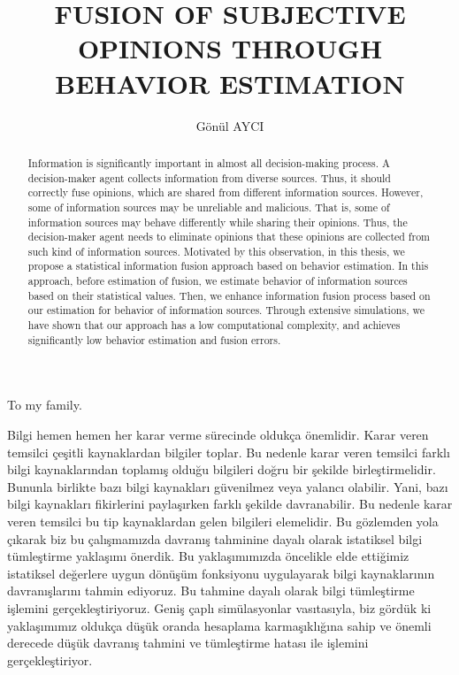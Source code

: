 \documentclass[a4,12pt]{ozu-thesis}
\title{ FUSION OF SUBJECTIVE OPINIONS THROUGH BEHAVIOR ESTIMATION}
\author{G\"{o}n\"{u}l AYCI}
\begin{document}


\begin{preliminary}

\begin{dedication}
\null\vfil
{\large
\begin{center}
To my family.
\end{center}}
\vfil\null
\end{dedication}

\begin{abstract}
Information is significantly important in almost all decision-making process. A decision-maker agent collects information from diverse sources. Thus, it should correctly fuse opinions, which are shared from different information sources. However, some of information sources may be unreliable and malicious. That is, some of information sources may behave differently while sharing their opinions. Thus, the decision-maker agent needs to eliminate opinions that these opinions are collected from such kind of information sources. Motivated by this observation, in this thesis, we propose a statistical information fusion approach based on behavior estimation. In this approach, before estimation of fusion, we estimate behavior of information sources based on their statistical values. Then, we enhance information fusion process based on our estimation for behavior of information sources. Through extensive simulations, we have shown that our approach has a low computational complexity, and achieves significantly low behavior estimation and fusion errors.

\end{abstract}

\begin{ozetce}
Bilgi hemen hemen her karar verme sürecinde oldukça önemlidir. Karar veren temsilci çeşitli kaynaklardan bilgiler toplar. Bu nedenle karar veren temsilci farklı bilgi kaynaklarından toplamış olduğu bilgileri doğru bir şekilde birleştirmelidir. Bununla birlikte bazı bilgi kaynakları güvenilmez veya yalancı olabilir. Yani, bazı bilgi kaynakları fikirlerini paylaşırken farklı şekilde davranabilir. Bu nedenle karar veren temsilci bu tip kaynaklardan gelen bilgileri elemelidir. Bu gözlemden yola çıkarak biz bu çalışmamızda davranış tahminine dayalı olarak istatiksel bilgi tümleştirme yaklaşımı önerdik. Bu yaklaşımımızda öncelikle elde ettiğimiz istatiksel değerlere uygun dönüşüm fonksiyonu uygulayarak bilgi kaynaklarının davranışlarını tahmin ediyoruz. Bu tahmine dayalı olarak bilgi tümleştirme işlemini gerçekleştiriyoruz. Geniş çaplı simülasyonlar vasıtasıyla, biz gördük ki yaklaşımımız oldukça düşük oranda hesaplama karmaşıklığına sahip ve önemli derecede düşük davranış tahmini ve tümleştirme hatası ile işlemini gerçekleştiriyor.  



\end{ozetce}
\end{preliminary}
\end{document}
